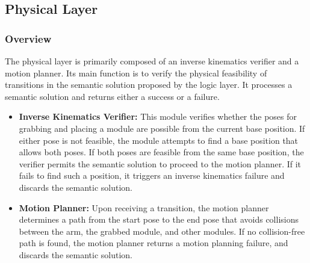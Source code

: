 \subsection{Physical Layer}
\subsubsection{Overview}
The physical layer is primarily composed of an inverse kinematics verifier and a motion planner. Its main function is to verify the physical feasibility of transitions in the semantic solution proposed by the logic layer. It processes a semantic solution and returns either a success or a failure.
\begin{itemize}[]
	\item\textbf{Inverse Kinematics Verifier:} This module verifies whether the poses for grabbing and placing a module are possible from the current base position. If either pose is not feasible, the module attempts to find a base position that allows both poses. If both poses are feasible from the same base position, the verifier permits the semantic solution to proceed to the motion planner. If it fails to find such a position, it triggers an inverse kinematics failure and discards the semantic solution.
	
	\item\textbf{Motion Planner:} Upon receiving a transition, the motion planner determines a path from the start pose to the end pose that avoids collisions between the arm, the grabbed module, and other modules. If no collision-free path is found, the motion planner returns a motion planning failure, and discards the semantic solution.
\end{itemize}

